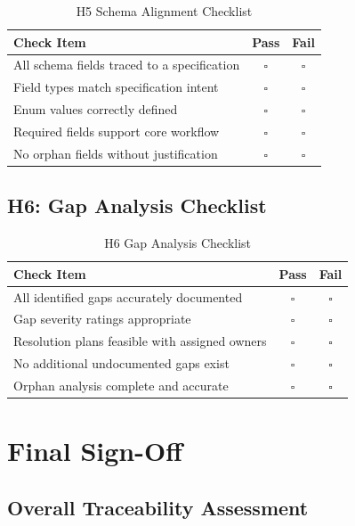\begin{table}[h]
\centering
\caption{H5 Schema Alignment Checklist}
\begin{tabular}{@{}L{10cm}cc@{}}
\toprule
\textbf{Check Item} & \textbf{Pass} & \textbf{Fail} \\
\midrule
All schema fields traced to a specification & $\square$ & $\square$ \\
Field types match specification intent & $\square$ & $\square$ \\
Enum values correctly defined & $\square$ & $\square$ \\
Required fields support core workflow & $\square$ & $\square$ \\
No orphan fields without justification & $\square$ & $\square$ \\
\bottomrule
\end{tabular}
\end{table}

\subsection{H6: Gap Analysis Checklist}

\begin{table}[h]
\centering
\caption{H6 Gap Analysis Checklist}
\begin{tabular}{@{}L{10cm}cc@{}}
\toprule
\textbf{Check Item} & \textbf{Pass} & \textbf{Fail} \\
\midrule
All identified gaps accurately documented & $\square$ & $\square$ \\
Gap severity ratings appropriate & $\square$ & $\square$ \\
Resolution plans feasible with assigned owners & $\square$ & $\square$ \\
No additional undocumented gaps exist & $\square$ & $\square$ \\
Orphan analysis complete and accurate & $\square$ & $\square$ \\
\bottomrule
\end{tabular}
\end{table}

\section{Final Sign-Off}
\label{sec:final-signoff}

\subsection{Overall Traceability Assessment}

